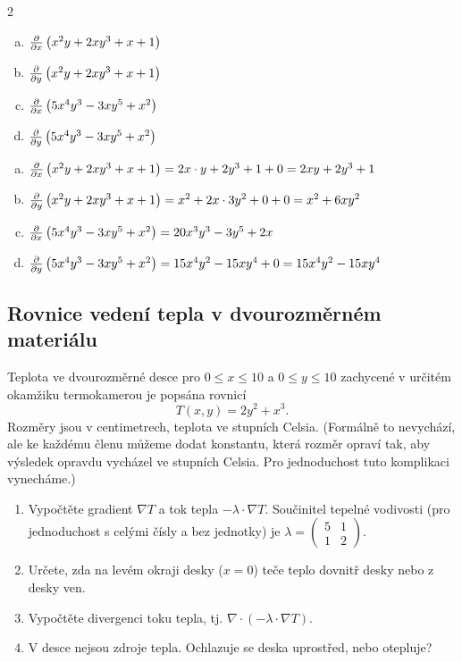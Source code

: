 \newcommand\pd[2][x]{\frac{\partial }{\partial #1}\left(\vphantom {\frac 22}#2\right)}
\begin{multicols}2
\begin{enumerate}[a)]
\item $\pd{x^2y+2xy^3+x+1}$
\item $\pd[y]{x^2y+2xy^3+x+1}$
\item $\pd{5x^4y^3-3xy^5+x^2}$
\item $\pd[y]{5x^4y^3-3xy^5+x^2}$
\end{enumerate}
\end{multicols}

\reseni
\begin{enumerate}[a)]
\item $\pd{x^2y+2xy^3+x+1}=2x\cdot y+2y^3+1+0=2xy+2y^3+1$
\item $\pd[y]{x^2y+2xy^3+x+1}=x^2+2x\cdot 3y^2+0+0=x^2+6xy^2$
\item $\pd{5x^4y^3-3xy^5+x^2}=20x^3y^3-3y^5+2x$
\item $\pd[y]{5x^4y^3-3xy^5+x^2}=15x^4y^2-15xy^4+0=15x^4y^2-15xy^4$
\end{enumerate}

\konec


\subsection{Rovnice vedení tepla v dvourozměrném materiálu}


Teplota ve dvourozměrné desce pro $0\leq x\leq 10$ a $0\leq y\leq 10$ zachycené v určitém okamžiku termokamerou je popsána rovnicí
  $$T(x,y)=2y^2+x^3.$$
  Rozměry jsou v centimetrech, teplota ve stupních Celsia. (Formálně to nevychází, ale ke každému členu můžeme dodat konstantu, která rozměr opraví tak, aby výsledek opravdu vycházel ve stupních Celsia. Pro jednoduchost tuto komplikaci vynecháme.)

\begin{enumerate}
\item Vypočtěte gradient $\nabla T$  a tok tepla $-\lambda \cdot \nabla T.$
Součinitel tepelné vodivosti (pro jednoduchost s celými čísly a bez jednotky) je $\lambda=
  \begin{pmatrix}
    5 & 1\\1&2
  \end{pmatrix}.
$ 
\item Určete, zda na levém okraji desky ($x=0$) teče teplo dovnitř desky nebo z desky ven.
\item Vypočtěte divergenci toku tepla, tj. $\nabla\cdot(-\lambda \cdot \nabla T).$
\item V desce nejsou zdroje tepla. Ochlazuje se deska uprostřed, nebo otepluje?
\end{enumerate}


